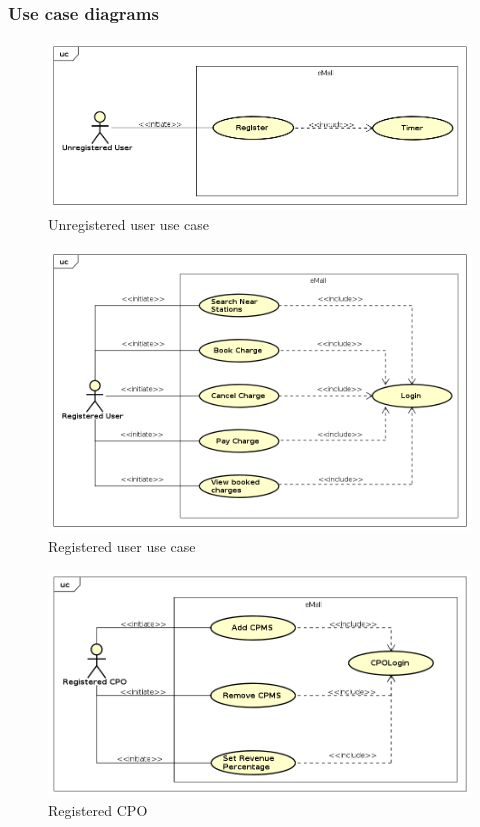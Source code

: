 \subsubsection{Use case diagrams}
\begin{figure}[!h]
    \includegraphics[keepaspectratio, width=16cm]{UseCase/UnregisteredUser.png}
    \caption{Unregistered user use case}
\end{figure}
\begin{figure}[!h]
    \includegraphics[keepaspectratio, width=16cm]{UseCase/RegisteredUser.png}
    \caption{Registered user use case}
\end{figure}
\begin{figure}[!h]
    \includegraphics[keepaspectratio, width=16cm]{UseCase/RegisteredCPO.png}
    \caption{Registered \ac{CPO}}
\end{figure}
